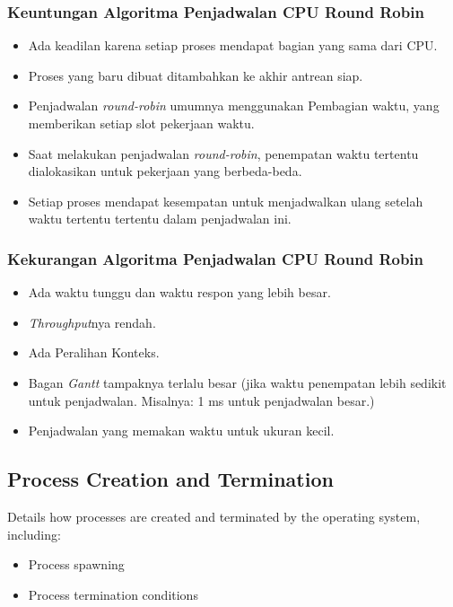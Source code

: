 \documentclass[12pt]{article}
\begin{document}
		\subsubsection*{Keuntungan Algoritma Penjadwalan CPU Round Robin}
		\begin{itemize}
			\item Ada keadilan karena setiap proses mendapat bagian yang sama dari CPU.
			\item Proses yang baru dibuat ditambahkan ke akhir antrean siap.
			\item Penjadwalan \textit{round-robin} umumnya menggunakan Pembagian waktu, yang memberikan setiap slot pekerjaan waktu. 
			\item Saat melakukan penjadwalan \textit{round-robin}, penempatan waktu tertentu dialokasikan untuk pekerjaan yang berbeda-beda. 
			\item Setiap proses mendapat kesempatan untuk menjadwalkan ulang setelah waktu tertentu tertentu dalam penjadwalan ini. 
		\end{itemize}
		
		\subsubsection*{Kekurangan Algoritma Penjadwalan CPU Round Robin}
		\begin{itemize}
			\item Ada waktu tunggu dan waktu respon yang lebih besar.
			\item \textit{Throughput}nya rendah.
			\item Ada Peralihan Konteks.
			\item Bagan \textit{Gantt} tampaknya terlalu besar (jika waktu penempatan lebih sedikit untuk penjadwalan. Misalnya: 1 ms untuk penjadwalan besar.)
			\item Penjadwalan yang memakan waktu untuk ukuran kecil.
		\end{itemize}

\subsection{Process Creation and Termination}
Details how processes are created and terminated by the operating system, including:
\begin{itemize}
    \item Process spawning
    \item Process termination conditions
\end{itemize}
\end{document}
